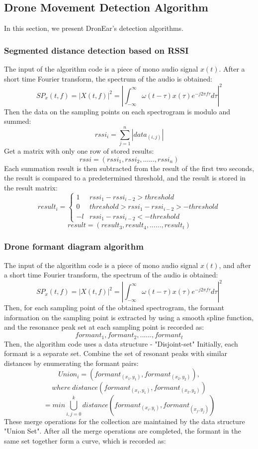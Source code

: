\documentclass{sig-alternate-10pt}
\begin{document}
\subsection{Drone Movement Detection Algorithm}
In this section, we present DronEar's detection algorithms.
\subsubsection{Segmented distance detection based on RSSI}
The input of the algorithm code is a piece of mono audio signal $x(t)$. After a short time Fourier transform, the spectrum of the audio is obtained:
$$SP_x(t,f)=|X(t,f)|^2=|\int_{-\infty}^\infty\omega(t-\tau)x(\tau)e^{-j2\pi f\tau}d\tau|^2$$
Then the data on the sampling points on each spectrogram is modulo and summed:
$$rssi_i=\sum_{j=1}^n|data_{(i,j)}|$$
Get a matrix with only one row of stored results:
$$rssi=(rssi_1,rssi_2,......,rssi_n)$$
Each summation result is then subtracted from the result of the first two seconds, the result is compared to a predetermined threshold, and the result is stored in the result matrix:
$$
result_i = \left\{ \begin{array}{ll}
1 & \textrm{$rssi_1-rssi_{i-2}>threshold$}\\
0 & \textrm{$threshold>rssi_1-rssi_{i-2}>-threshold$}\\
-l & \textrm{$rssi_1-rssi_{i-2}<-threshold$}
\end{array} \right.
$$
$$result=(result_3,result_4,......,result_t)$$
\subsubsection{Drone formant diagram algorithm}
The input of the algorithm code is a piece of mono audio signal $x(t)$, and after a short time Fourier transform, the spectrum of the audio is obtained:
$$SP_x(t,f)=|X(t,f)|^2=|\int_{-\infty}^\infty\omega(t-\tau)x(\tau)e^{-j2\pi f\tau}d\tau|^2$$
Then, for each sampling point of the obtained spectrogram, the formant information on the sampling point is extracted by using a smooth spline function, and the resonance peak set at each sampling point is recorded as:
$$formant_1,formant_2,......,formant_t$$
Then, the algorithm code uses a data structure - "Disjoint-set" Initially, each formant is a separate set. Combine the set of resonant peaks with similar distances by enumerating the formant pairs:
$$Union_i=(formant_{(x_1,y_1)},formant_{(x_2,y_2)}),$$
$$where\ distance(formant_{(x_1,y_1)},formant_{(x_2,y_2)})$$
$$=min\bigcup_{i,j=0}^k distance(formant_{(x_i,y_i)},formant_{(x_j,y_j)})$$
These merge operations for the collection are maintained by the data structure "Union Set". After all the merge operations are completed, the formant in the same set together form a curve, which is recorded as:
\end{document}
